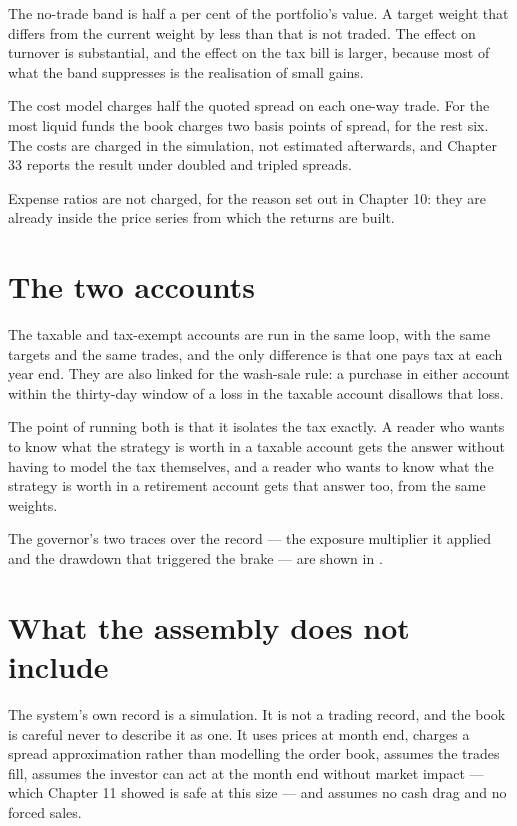 The no-trade band is half a per cent of the portfolio's value. A target
weight that differs from the current weight by less than that is not
traded. The effect on turnover is substantial, and the effect on the
tax bill is larger, because most of what the band suppresses is the
realisation of small gains.

The cost model charges half the quoted spread on each one-way trade. For
the most liquid funds the book charges two basis points of spread, for
the rest six. The costs are charged in the simulation, not estimated
afterwards, and Chapter 33 reports the result under doubled and tripled
spreads.

Expense ratios are not charged, for the reason set out in Chapter 10: they
are already inside the price series from which the returns are built.

\section{The two accounts}

The taxable and tax-exempt accounts are run in the same loop, with the same
targets and the same trades, and the only difference is that one pays tax
at each year end. They are also linked for the wash-sale rule: a
purchase in either account within the thirty-day window of a loss in the
taxable account disallows that loss.

The point of running both is that it isolates the tax exactly. A reader
who wants to know what the strategy is worth in a taxable account gets
the answer without having to model the tax themselves, and a reader who
wants to know what the strategy is worth in a retirement account gets
that answer too, from the same weights.

The governor's two traces over the record --- the exposure multiplier it applied and the drawdown that triggered the brake --- are shown in .

\section{What the assembly does not include}

The system's own record is a simulation. It is not a trading record, and
the book is careful never to describe it as one. It uses prices at month
end, charges a spread approximation rather than modelling the order
book, assumes the trades fill, assumes the investor can act at the month
end without market impact --- which Chapter 11 showed is safe at this
size --- and assumes no cash drag and no forced sales.

